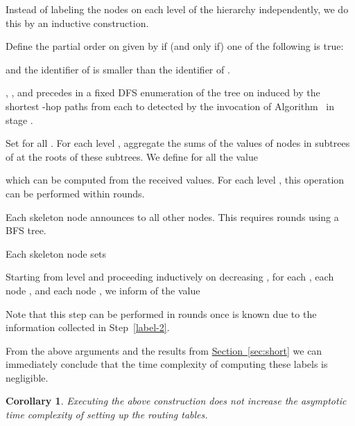 \documentclass[letterpaper,11pt]{article}
\newcommand{\namedref}[2]{\hyperref[#2]{#1~\ref*{#2}}}
\newcommand{\sectionref}[1]{\namedref{Section}{#1}}
\newtheorem{corollary}[theorem]{Corollary}
\begin{document}
Instead of labeling the nodes on each level of the hierarchy independently, we
do this by an inductive construction.
\begin{compactenum}
\item Define the partial order  on  given by  if (and only
if) one of the following is true:
\begin{compactitem}
\item  and the identifier of  is smaller than the identifier of
.
\item , , and  precedes  in a
fixed DFS enumeration of the tree  on
 induced by the shortest -hop paths from
each  to  detected by the
invocation of Algorithm~ in stage .
\end{compactitem}
\item \label{label-2} Set  for all . For
each level , aggregate the sums of the values
 of nodes  in subtrees of
 at the roots of these subtrees. We define for all 
the value

which can be computed from the received values. For each level , this
operation can be performed within  rounds.
\item Each skeleton node  announces  to all
other nodes. This requires  rounds using a BFS tree.
\item Each skeleton node  sets 

\item Starting from level  and proceeding inductively on decreasing , for
each , each node , and each node , we inform  of the value

Note that this step can be performed in  rounds once  is
known due to the information collected in Step~\ref{label-2}.
\end{compactenum}
From the above arguments and the results from \sectionref{sec:short} we can
immediately conclude that the time complexity of computing these labels is
negligible.
\begin{corollary}\label{coro:label_time}
Executing the above construction does not increase the asymptotic time
complexity of setting up the routing tables.
\end{corollary}
\end{document}
